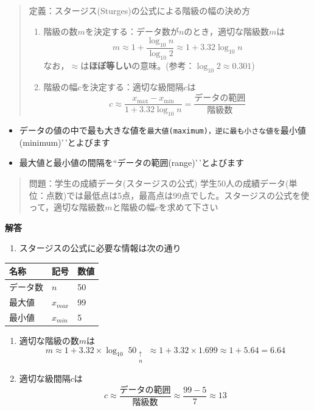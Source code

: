 \documentclass[
]{book}
\providecommand{\tightlist}{%
  \setlength{\itemsep}{0pt}\setlength{\parskip}{0pt}}
\theoremstyle{definition}
\theoremstyle{definition}
\theoremstyle{definition}
\theoremstyle{definition}
\theoremstyle{remark}
\begin{document}
\begin{quote}
定義：スタージス(Sturges)の公式による階級の幅の決め方

\begin{enumerate}
\def\labelenumi{\arabic{enumi}.}
\tightlist
\item
  階級の数\(m\)を決定する：データ数が\(n\)のとき，適切な階級数\(m\)は
  \[
  m \approx 1+\frac{\log_{10} n}{\log_{10} 2} \approx 1+3.32 \log_{10} n
  \]
  なお，\(\approx\)は\textbf{ほぼ等しい}の意味。(参考：\(\log_{10} 2 \approx 0.301\))
\item
  階級の幅\(c\)を決定する：適切な級間隔\(c\)は
  \[
  c \approx \frac{x_{\max}-x_{\min}}{1+3.32 \log_{10} n}=\frac{\text{データの範囲}}{\text{階級数}}
  \]
\end{enumerate}
\end{quote}

\begin{itemize}
\tightlist
\item
  データの値の中で最も大きな値を\texttt{最大値(maximum)\textquotesingle{}\textquotesingle{}，逆に最も小さな値を}最小値(minimum)'\,'とよびます
\item
  最大値と最小値の間隔を``データの範囲(range)'\,'とよびます
\end{itemize}

\begin{quote}
問題：学生の成績データ(スタージスの公式)
学生50人の成績データ(単位：点数)では最低点は5点，最高点は99点でした。スタージスの公式を使って，適切な階級数\(m\)と階級の幅\(c\)を求めて下さい
\end{quote}

\textbf{解答}

\begin{enumerate}
\def\labelenumi{\arabic{enumi}.}
\tightlist
\item
  スタージスの公式に必要な情報は次の通り
\end{enumerate}

\begin{longtable}[]{@{}lll@{}}
\toprule()
名称 & 記号 & 数値 \\
\midrule()
\endhead
データ数 & \(n\) & 50 \\
最大値 & \(x_{max}\) & 99 \\
最小値 & \(x_{min}\) & 5 \\
\bottomrule()
\end{longtable}

\begin{enumerate}
\def\labelenumi{\arabic{enumi}.}
\setcounter{enumi}{1}
\item
  適切な階級の数\(m\)は
  \[
  m 
  \approx 1+3.32 \times \log_{10} \mathop{50}_{\substack{\uparrow \\ n}}
  \approx 1+3.32 \times 1.699
  \approx 1+5.64 = 6.64
  \]
\item
  適切な級間隔\(c\)は
  \[
  c 
  \approx \frac{\text{データの範囲}}{\text{階級数}}
  \approx \frac{99-5}{7} 
  \approx 13
  \]
\end{enumerate}
\end{document}
